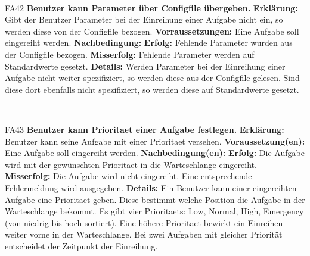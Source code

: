\documentclass[a4paper,12pt]{article}
\begin{document}
\begin{itemize}[nosep]
\begin{minipage}[t]{\linewidth}
	\end{minipage}
	\newline
	\\
	
	\begin{minipage}[t]{\linewidth}
		\item[FA42] \textbf{Benutzer kann Parameter über \gls{Configfile} übergeben.}
		\subitem \textbf{Erklärung:} Gibt der Benutzer Parameter bei der Einreihung einer Aufgabe nicht ein, so werden diese von der \gls{Configfile} bezogen.
		\subitem \textbf{Vorraussetzungen:} Eine Aufgabe soll eingereiht werden.
		\subitem \textbf{Nachbedingung:}
		\subsubitem \textbf{Erfolg:} Fehlende Parameter wurden aus der \gls{Configfile} bezogen.
		\subsubitem \textbf{Misserfolg:} Fehlende Parameter werden auf Standardwerte gesetzt.
		\subitem \textbf{Details:} Werden Parameter bei der Einreihung einer Aufgabe nicht weiter spezifiziert, so werden diese aus der \gls{Configfile} gelesen. Sind diese dort ebenfalls nicht spezifiziert, so werden diese auf Standardwerte gesetzt.
	\end{minipage}
	\newline
	\\
	
	\begin{minipage}[t]{\linewidth}
		\item[FA43] \textbf{Benutzer kann \gls{Prioritaet} einer Aufgabe festlegen.}
		\subitem \textbf{Erklärung:} \gls{Benutzer} kann seine Aufgabe mit einer \gls{Prioritaet} versehen.
		\subitem \textbf{Voraussetzung(en):} Eine Aufgabe soll eingereiht werden.
		\subitem \textbf{Nachbedingung(en):}
		\subsubitem \textbf{Erfolg:} Die Aufgabe wird mit der gewünschten \gls{Prioritaet} in die Warteschlange eingereiht.
		\subsubitem \textbf{Misserfolg:} Die Aufgabe wird nicht eingereiht. Eine entsprechende Fehlermeldung wird ausgegeben.
		\subitem \textbf{Details:} Ein \gls{Benutzer} kann einer eingereihten Aufgabe eine \gls{Prioritaet} geben. Diese bestimmt welche Position die Aufgabe in der Warteschlange bekommt. Es gibt vier \glspl{Prioritaet}: Low, Normal, High, Emergency (von niedrig bis hoch sortiert). Eine höhere \gls{Prioritaet} bewirkt ein Einreihen weiter vorne in der Warteschlange. Bei zwei Aufgaben mit gleicher Priorität entscheidet der Zeitpunkt der Einreihung.
    \end{minipage}	
	\newline
	\\
	

\end{itemize}
\end{document}
